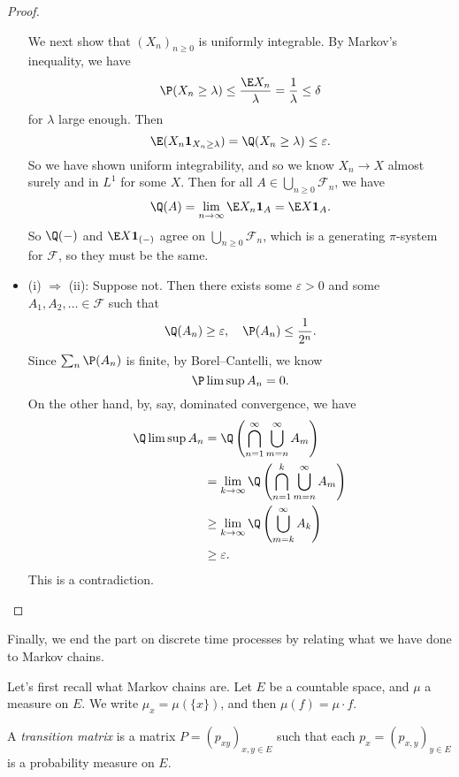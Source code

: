 \documentclass[a4paper]{article}
\begin{document}
\begin{proof}
\begin{itemize}
      We next show that $(X_n)_{n \geq 0}$ is uniformly integrable. By Markov's inequality, we have
      \[
        \P(X_n \geq \lambda) \leq \frac{\E X_n}{\lambda} = \frac{1}{\lambda}\leq \delta
      \]
      for $\lambda$ large enough. Then
      \[
        \E(X_n \mathbf{1}_{X_n \geq \lambda}) = \Q(X_n \geq \lambda) \leq \varepsilon.
      \]
      So we have shown uniform integrability, and so we know $X_n \to X$ almost surely and in $L^1$ for some $X$. Then for all $A \in \bigcup_{n \geq 0} \mathcal{F}_n$, we have
      \[
        \Q(A) = \lim_{n \to \infty} \E X_n \mathbf{1}_A = \E X \mathbf{1}_A.
      \]
      So $\Q(-)$ and $\E X \mathbf{1}_{(-)}$ agree on $\bigcup_{n \geq 0} \mathcal{F}_n$, which is a generating $\pi$-system for $\mathcal{F}$, so they must be the same.
    \item (i) $\Rightarrow$ (ii): Suppose not. Then there exists some $\varepsilon > 0$ and some $A_1, A_2, \ldots \in \mathcal{F}$ such that
      \[
        \Q(A_n) \geq \varepsilon,\quad \P(A_n) \leq \frac{1}{2^n}.
      \]
      Since $\sum_n \P(A_n)$ is finite, by Borel--Cantelli, we know
      \[
        \P \limsup A_n = 0.
      \]
      On the other hand, by, say, dominated convergence, we have
      \begin{align*}
        \Q\limsup A_n &= \Q \left(\bigcap_{n = 1}^\infty \bigcup_{m = n}^\infty A_m\right) \\
        &= \lim_{k \to \infty} \Q\left(\bigcap_{n = 1}^k \bigcup_{m = n}^\infty A_m \right)\\
        &\geq \lim_{k \to \infty} \Q \left(\bigcup_{m = k}^\infty A_k\right)\\
        &\geq \varepsilon.
      \end{align*}
      This is a contradiction.\qedhere
  \end{itemize}
\end{proof}

Finally, we end the part on discrete time processes by relating what we have done to Markov chains.

Let's first recall what Markov chains are. Let $E$ be a countable space, and $\mu$ a measure on $E$. We write $\mu_x = \mu(\{x\})$, and then $\mu(f) = \mu \cdot f$.

\begin{defi}
  A \emph{transition matrix} is a matrix $P = (p_{xy})_{x, y \in E}$ such that each $p_x = (p_{x, y})_{y \in E}$ is a probability measure on $E$.
\end{defi}
\end{document}
